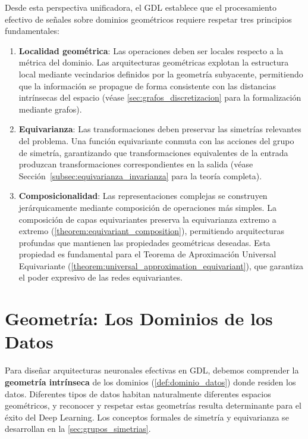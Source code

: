 Desde esta perspectiva unificadora, el \gls{GDL} establece que el procesamiento efectivo de señales sobre dominios geométricos requiere respetar tres principios fundamentales:

\begin{enumerate}
    \item \textbf{Localidad geométrica}: Las operaciones deben ser locales respecto a la métrica del dominio. Las arquitecturas geométricas explotan la estructura local mediante vecindarios definidos por la geometría subyacente, permitiendo que la información se propague de forma consistente con las distancias intrínsecas del espacio (véase \autoref{sec:grafos_discretizacion} para la formalización mediante grafos).

    \item \textbf{Equivarianza}: Las transformaciones deben preservar las simetrías relevantes del problema. Una función equivariante conmuta con las acciones del grupo de simetría, garantizando que transformaciones equivalentes de la entrada produzcan transformaciones correspondientes en la salida (véase Sección~\ref{subsec:equivarianza_invarianza} para la teoría completa).

    \item \textbf{Composicionalidad}: Las representaciones complejas se construyen jerárquicamente mediante composición de operaciones más simples. La composición de capas equivariantes preserva la equivarianza extremo a extremo (\autoref{theorem:equivariant_composition}), permitiendo arquitecturas profundas que mantienen las propiedades geométricas deseadas. Esta propiedad es fundamental para el Teorema de Aproximación Universal Equivariante (\autoref{theorem:universal_approximation_equivariant}), que garantiza el poder expresivo de las redes equivariantes.
\end{enumerate}

\section{Geometría: Los Dominios de los Datos}\label{sec:geometria_dominios}

Para diseñar arquitecturas neuronales efectivas en \gls{GDL}, debemos comprender la \textbf{geometría intrínseca} de los dominios (\autoref{def:dominio_datos}) donde residen los datos. Diferentes tipos de datos habitan naturalmente diferentes espacios geométricos, y reconocer y respetar estas geometrías resulta determinante para el éxito del Deep Learning. Los conceptos formales de simetría y equivarianza se desarrollan en la \autoref{sec:grupos_simetrias}.


